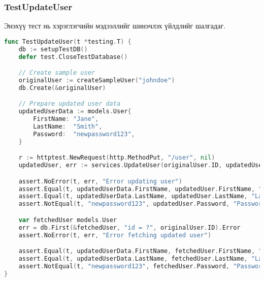\subsubsection{TestUpdateUser}

Энэхүү тест нь хэрэглэгчийн мэдээллийг шинэчлэх үйлдлийг шалгадаг.

\begin{lstlisting}[language=Go, caption=Test Update User Function, frame=single]
func TestUpdateUser(t *testing.T) {
    db := setupTestDB()
    defer test.CloseTestDatabase()

    // Create sample user
    originalUser := createSampleUser("johndoe")
    db.Create(&originalUser)

    // Prepare updated user data
    updatedUserData := models.User{
        FirstName: "Jane",
        LastName:  "Smith",
        Password:  "newpassword123",
    }

    r := httptest.NewRequest(http.MethodPut, "/user", nil)
    updatedUser, err := services.UpdateUser(originalUser.ID, updatedUserData, r)

    assert.NoError(t, err, "Error updating user")
    assert.Equal(t, updatedUserData.FirstName, updatedUser.FirstName, "First name mismatch")
    assert.Equal(t, updatedUserData.LastName, updatedUser.LastName, "Last name mismatch")
    assert.NotEqual(t, "newpassword123", updatedUser.Password, "Password should be hashed")

    var fetchedUser models.User
    err = db.First(&fetchedUser, "id = ?", originalUser.ID).Error
    assert.NoError(t, err, "Error fetching updated user")

    assert.Equal(t, updatedUserData.FirstName, fetchedUser.FirstName, "First name mismatch in database")
    assert.Equal(t, updatedUserData.LastName, fetchedUser.LastName, "Last name mismatch in database")
    assert.NotEqual(t, "newpassword123", fetchedUser.Password, "Password should be hashed in database")
}
\end{lstlisting}


